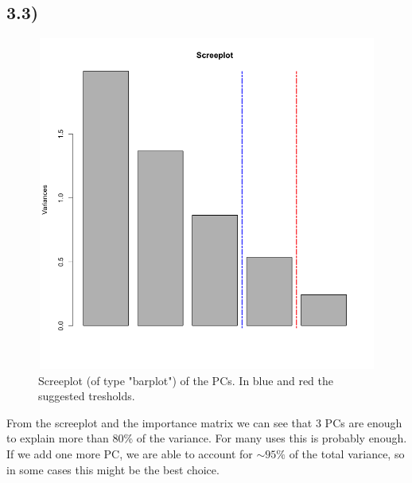 \documentclass[a4paper,11pt,oneside]{report}
\begin{document}
\subsection*{3.3)}
	\begin{figure}[H]
	\centering
	\includegraphics[height = 11cm, width = 15cm]{screeplot_bar.png}
	\caption{Screeplot (of type "barplot") of the PCs. In blue and red the suggested tresholds.}
	\end{figure}
	From the screeplot and the importance matrix we can see that 3 PCs are enough to explain more than 80\% of the variance. For many uses this is probably enough. If we add one more PC, we are able to account for $\sim95\%$ of the total variance, so in some cases this might be the best choice.
\end{document}
